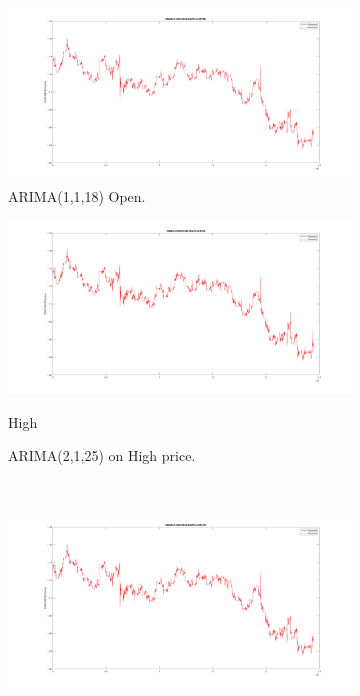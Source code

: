 \documentclass[11pt]{article}
\begin{document}
\begin{figure}[H]
  \begin{subfigure}[b]{0.5\textwidth}
    \includegraphics[width=\textwidth,keepaspectratio]{figs/arima_1_1_18_open.png}
    \caption{ARIMA(1,1,18) Open.}
  \end{subfigure}
  \quad\quad\quad\quad\quad\quad\quad
  \begin{subfigure}[b]{0.5\textwidth}
    \includegraphics[width=\linewidth,keepaspectratio]{figs/arima_2_1_25_high.png}
    \caption{High}
    \caption{ARIMA(2,1,25) on High price.}
  \end{subfigure}\\
  \begin{subfigure}[b]{0.5\textwidth}
    \includegraphics[width=\linewidth,keepaspectratio]{figs/arima_26_1_1_low.png}

\end{subfigure}
\end{figure}
\end{document}
